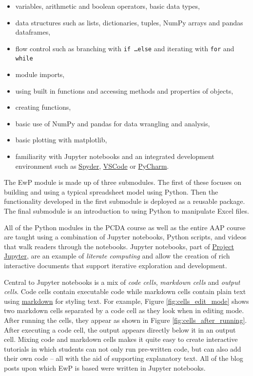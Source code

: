 \documentclass[ited]{informs3}                      %
\begin{document}
\begin{itemize}
	\item variables, arithmetic and boolean operators, basic data types,
	\item data structures such as lists, dictionaries, tuples, NumPy arrays and pandas dataframes,
	\item flow control such as branching with \texttt{if \ldots else} and iterating with \texttt{for} and \texttt{while}
	\item module imports,
	\item using built in functions and accessing methods and properties of objects,
	\item creating functions,
	\item basic use of NumPy and pandas for data wrangling and analysis,
	\item basic plotting with matplotlib,
	\item familiarity with Jupyter notebooks and an integrated development environment such as \href{https://www.spyder-ide.org/}{Spyder}, \href{https://code.visualstudio.com/}{VSCode} or \href{https://www.jetbrains.com/pycharm/}{PyCharm}.
\end{itemize}

The EwP module is made up of three submodules. The first of these focuses on building and using a typical spreadsheet model using Python. Then the functionality developed in the first submodule is deployed as a reusable package. The final submodule is an introduction to using Python to manipulate Excel files.

All of the Python modules in the PCDA course as well as the entire AAP course are taught using a combination of Jupyter notebooks, Python scripts, and videos that walk readers through the notebooks. Jupyter notebooks, part of \href{https://jupyter.org/}{Project Jupyter}, are an example of \textit{literate computing} \citep{perez2015project} and allow the creation of rich interactive documents that support iterative exploration and development. 

Central to Jupyter notebooks is a mix of \textit{code cells}, \textit{markdown cells} and \textit{output cells}. Code cells contain executable code while markdown cells contain plain text using \href{URL}{markdown} for styling text. For example, Figure \ref{fig:cells_edit_mode} shows two markdown cells separated by a code cell as they look when in editing mode. After running the cells, they appear as shown in Figure \ref{fig:cells_after_running}. After executing a code cell, the output appears directly below it in an output cell. Mixing code and markdown cells makes it quite easy to create interactive tutorials in which students can not only run pre-written code, but can also add their own code -- all with the aid of supporting explanatory text. All of the blog posts upon which EwP is based were written in Jupyter notebooks. 
\end{document}
